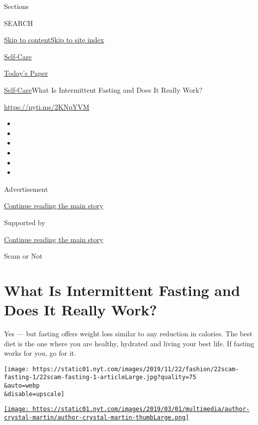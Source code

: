 Sections

SEARCH

\protect\hyperlink{site-content}{Skip to
content}\protect\hyperlink{site-index}{Skip to site index}

\href{https://www.nytimes.com/section/style/self-care/}{Self-Care}

\href{https://myaccount.nytimes.com/auth/login?response_type=cookie\&client_id=vi}{}

\href{https://www.nytimes.com/section/todayspaper}{Today's Paper}

\href{/section/style/self-care/}{Self-Care}\textbar{}What Is
Intermittent Fasting and Does It Really Work?

\url{https://nyti.ms/2KNpYVM}

\begin{itemize}
\item
\item
\item
\item
\item
\item
\end{itemize}

Advertisement

\protect\hyperlink{after-top}{Continue reading the main story}

Supported by

\protect\hyperlink{after-sponsor}{Continue reading the main story}

Scam or Not

\hypertarget{what-is-intermittent-fasting-and-does-it-really-work}{%
\section{What Is Intermittent Fasting and Does It Really
Work?}\label{what-is-intermittent-fasting-and-does-it-really-work}}

Yes --- but fasting offers weight loss similar to any reduction in
calories. The best diet is the one where you are healthy, hydrated and
living your best life. If fasting works for you, go for it.

\texttt{[image: https://static01.nyt.com/images/2019/11/22/fashion/22scam-fasting-1/22scam-fasting-1-articleLarge.jpg?quality=75\\\&auto=webp\\\&disable=upscale]}

\href{https://www.nytimes.com/by/crystal-martin}{\texttt{[image: https://static01.nyt.com/images/2019/03/01/multimedia/author-crystal-martin/author-crystal-martin-thumbLarge.png]}}

